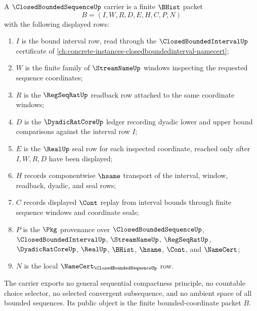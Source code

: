 \begin{definition}
\label{def:closed-bounded-sequence-carrier}
A $\ClosedBoundedSequenceUp$ carrier is a finite $\BHist$ packet
$$
B=(I,W,R,D,E,H,C,P,N)
$$
with the following displayed rows:
\begin{enumerate}
\item $I$ is the bound interval row, read through the $\ClosedBoundedIntervalUp$ certificate of \autoref{ch:concrete-instances-closedboundedinterval-namecert};
\item $W$ is the finite family of $\StreamNameUp$ windows inspecting the requested sequence coordinates;
\item $R$ is the $\RegSeqRatUp$ readback row attached to the same coordinate windows;
\item $D$ is the $\DyadicRatCoreUp$ ledger recording dyadic lower and upper bound comparisons against the interval row $I$;
\item $E$ is the $\RealUp$ seal row for each inspected coordinate, reached only after $I,W,R,D$ have been displayed;
\item $H$ records componentwise $\hsame$ transport of the interval, window, readback, dyadic, and seal rows;
\item $C$ records displayed $\Cont$ replay from interval bounds through finite sequence windows and coordinate seals;
\item $P$ is the $\Pkg$ provenance over $\ClosedBoundedSequenceUp$, $\ClosedBoundedIntervalUp$, $\StreamNameUp$, $\RegSeqRatUp$, $\DyadicRatCoreUp$, $\RealUp$, $\BHist$, $\hsame$, $\Cont$, and $\NameCert$;
\item $N$ is the local $\NameCert_{\ClosedBoundedSequenceUp}$ row.
\end{enumerate}
The carrier exports no general sequential compactness principle, no countable choice selector, no selected convergent subsequence, and no ambient space of all bounded sequences. Its public object is the finite bounded-coordinate packet $B$.
\end{definition}

